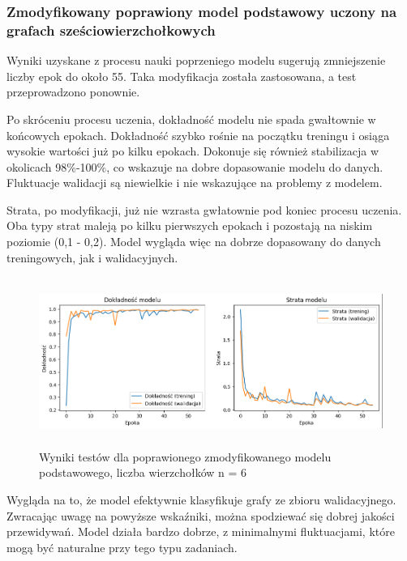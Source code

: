 
\subsubsection{Zmodyfikowany poprawiony model podstawowy uczony na grafach sześciowierzchołkowych}

Wyniki uzyskane z procesu nauki poprzeniego modelu sugerują zmniejszenie liczby epok do około 55.
Taka modyfikacja została zastosowana, a test przeprowadzono ponownie.

Po skróceniu procesu uczenia, dokładność modelu nie spada gwałtownie w końcowych epokach.
Dokładność szybko rośnie na początku treningu i osiąga wysokie wartości już po kilku epokach.
Dokonuje się również stabilizacja w okolicach 98\%-100\%, co wskazuje na dobre dopasowanie modelu do danych.
Fluktuacje walidacji są niewielkie i nie wskazujące na problemy z modelem.

Strata, po modyfikacji, już nie wzrasta gwłatownie pod koniec procesu uczenia.
Oba typy strat maleją po kilku pierwszych epokach i pozostają na niskim poziomie (0,1 - 0,2).
Model wygląda więc na dobrze dopasowany do danych treningowych, jak i walidacyjnych.

\begin{figure}[ht]
	\centering
	\includegraphics[height=5.5cm]{resources/tests/images/v4/base6_1_1_img.png}
	\caption{Wyniki testów dla poprawionego zmodyfikowanego modelu podstawowego, liczba wierzchołków n = 6}
	\label{Fig:tests-best-1a}
\end{figure}
\FloatBarrier

Wygląda na to, że model efektywnie klasyfikuje grafy ze zbioru walidacyjnego.
Zwracając uwagę na powyższe wskaźniki, można spodziewać się dobrej jakości przewidywań.
Model działa bardzo dobrze, z minimalnymi fluktuacjami, które mogą być naturalne przy tego typu zadaniach.

